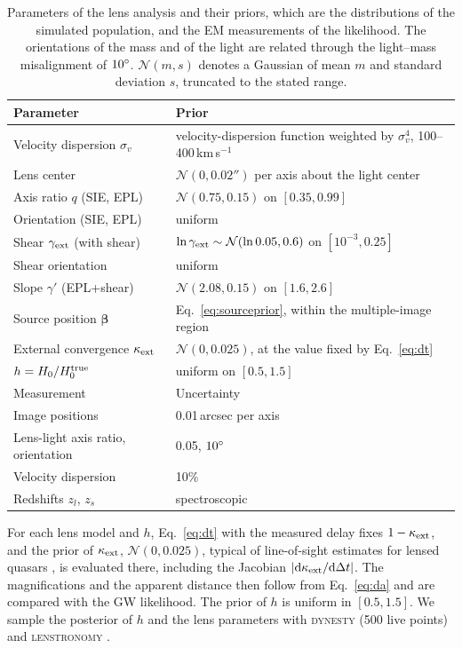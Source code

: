 \begin{table}
\caption{Parameters of the lens analysis and their priors, which are the distributions of the simulated population, and the EM measurements of the likelihood. The orientations of the mass and of the light are related through the light--mass misalignment of $10\degr$. $\mathcal N(m,s)$ denotes a Gaussian of mean $m$ and standard deviation $s$, truncated to the stated range.}
\label{tab:priors}
\footnotesize
\begin{tabularx}{\linewidth}{@{}lL@{}}
\toprule
Parameter & Prior \\
\midrule
Velocity dispersion $\sigma_v$ & velocity-dispersion function weighted by $\sigma_v^4$, 100--400\,km\,s$^{-1}$ \\
Lens center & $\mathcal N(0,0.02'')$ per axis about the light center \\
Axis ratio $q$ (SIE, EPL) & $\mathcal N(0.75,0.15)$ on $[0.35,0.99]$ \\
Orientation (SIE, EPL) & uniform \\
Shear $\gamma_{\rm ext}$ (with shear) & $\ln\gamma_{\rm ext}\sim\mathcal N(\ln0.05,0.6)$ on $[10^{-3},0.25]$ \\
Shear orientation & uniform \\
Slope $\gamma'$ (EPL+shear) & $\mathcal N(2.08,0.15)$ on $[1.6,2.6]$ \\
Source position $\boldsymbol\beta$ & Eq.~\eqref{eq:sourceprior}, within the multiple-image region \\
External convergence $\kappa_{\rm ext}$ & $\mathcal N(0,0.025)$, at the value fixed by Eq.~\eqref{eq:dt} \\
$h=H_0/H_0^{\rm true}$ & uniform on $[0.5,1.5]$ \\
\midrule
Measurement & Uncertainty \\
\midrule
Image positions & 0.01\,arcsec per axis \\
Lens-light axis ratio, orientation & 0.05, $10\degr$ \\
Velocity dispersion & 10\% \\
Redshifts $z_l$, $z_s$ & spectroscopic \\
\bottomrule
\end{tabularx}
\end{table}

For each lens model and $h$, Eq.~\eqref{eq:dt} with the measured delay fixes $1-\kappa_{\rm ext}$, and the prior of $\kappa_{\rm ext}$, $\mathcal N(0,0.025)$, typical of line-of-sight estimates for lensed quasars \citep{rusu2017kext}, is evaluated there, including the Jacobian $|{\rm d}\kappa_{\rm ext}/{\rm d}\Delta t|$. The magnifications and the apparent distance then follow from Eq.~\eqref{eq:da} and are compared with the GW likelihood. The prior of $h$ is uniform in $[0.5,1.5]$. We sample the posterior of $h$ and the lens parameters with \textsc{dynesty} (500 live points) and \textsc{lenstronomy} \citep{birrer2018lenstronomy,birrer2021lenstronomy}.

